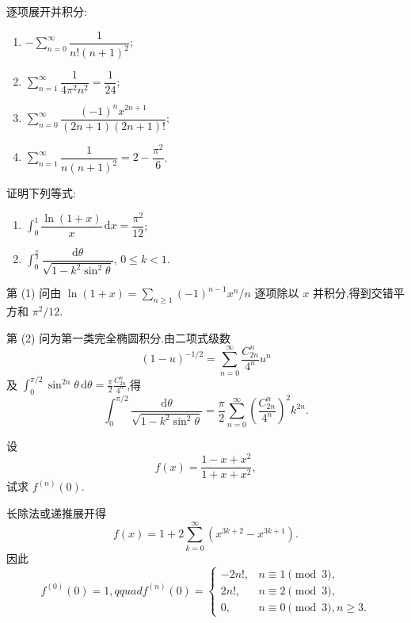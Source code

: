 \begin{solution}
    逐项展开并积分:
    \begin{enumerate}
        \item $\displaystyle-\sum\limits_{n=0}^{\infty}\dfrac{1}{n!(n+1)^2}$;
        \item $\displaystyle\sum\limits_{n=1}^{\infty}\dfrac{1}{4\pi^2n^2}=\dfrac{1}{24}$;
        \item $\displaystyle\sum\limits_{n=0}^{\infty}\dfrac{(-1)^nx^{2n+1}}{(2n+1)(2n+1)!}$;
        \item $\displaystyle\sum\limits_{n=1}^{\infty}\dfrac{1}{n(n+1)^2}=2-\dfrac{\pi^2}{6}$.
    \end{enumerate}
\end{solution}

\begin{example}
    证明下列等式:
    \begin{enumerate}
        \item $\displaystyle\int_0^1\dfrac{\ln(1+x)}{x}\,\mathrm{d}x=\dfrac{\pi^2}{12}$;
        \item $\displaystyle\int_0^{\frac{\pi}{2}}\dfrac{\mathrm{d}\theta}{\sqrt{1-k^2\sin^2\theta}}$, $0\leq k<1$.
    \end{enumerate}
\end{example}
\exampleblank

\begin{solution}
    第 (1) 问由 $\ln(1+x)=\sum_{n\geq1}(-1)^{n-1}x^n/n$ 逐项除以 $x$ 并积分,得到交错平方和 $\pi^2/12$.

    第 (2) 问为第一类完全椭圆积分.由二项式级数
    \[
        (1-u)^{-1/2}=\sum\limits_{n=0}^{\infty}\dfrac{C_{2n}^{n}}{4^n}u^n
    \]
    及 $\int_0^{\pi/2}\sin^{2n}\theta\,\mathrm{d}\theta
        =\frac{\pi}{2}\frac{C_{2n}^{n}}{4^n}$,得
    \[
        \int_0^{\pi/2}\dfrac{\mathrm{d}\theta}{\sqrt{1-k^2\sin^2\theta}}
        =\dfrac{\pi}{2}\sum\limits_{n=0}^{\infty}
        \left(\dfrac{C_{2n}^{n}}{4^n}\right)^2k^{2n}.
    \]
\end{solution}




\begin{example}
    设
    \[
        f(x)=\dfrac{1-x+x^2}{1+x+x^2},
    \]
    试求 $f^{(n)}(0)$.
\end{example}
\exampleblank

\begin{solution}
    长除法或递推展开得
    \[
        f(x)=1+2\sum\limits_{k=0}^{\infty}(x^{3k+2}-x^{3k+1}).
    \]
    因此
    \[
        f^{(0)}(0)=1,qquad
        f^{(n)}(0)=
        \begin{cases}
            -2n!, & n\equiv1\pmod3,         \\
            2n!,  & n\equiv2\pmod3,         \\
            0,    & n\equiv0\pmod3, n\geq3.
        \end{cases}
    \]
\end{solution}


